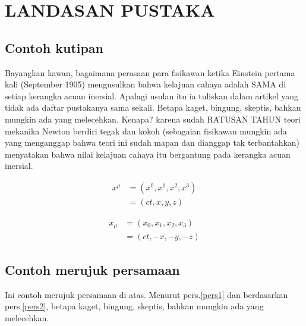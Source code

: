 \chapter{LANDASAN PUSTAKA}

\section{Contoh kutipan}
Bayangkan kawan, bagaimana perasaan para fisikawan ketika Einstein pertama kali (September 1905) mengusulkan bahwa kelajuan  cahaya adalah SAMA di setiap kerangka acuan inersial. Apalagi usulan itu ia tuliskan dalam artikel yang tidak ada daftar pustakanya sama sekali. Betapa kaget, bingung, skeptis, bahkan mungkin ada yang melecehkan. Kenapa? karena sudah RATUSAN TAHUN teori mekanika Newton berdiri tegak dan kokoh (sebagaian fisikawan mungkin ada yang menganggap bahwa teori ini sudah mapan dan dianggap tak terbantahkan) menyatakan bahwa nilai kelajuan cahaya itu bergantung pada kerangka acuan inersial\cite{arikunto2002}. 

\begin{equation}
\label{pers1}
\begin{split}
x^\mu & = (x^0,x^1,x^2,x^3 )\\ 
& = ( ct,x,y,z )
\end{split}
\end{equation}

\begin{equation}
\label{pers2}
\begin{split}
x_\mu & = (x_0,x_1,x_2,x_3 )\\
& = ( ct,-x,-y,-z )
\end{split}
\end{equation}

\section{Contoh merujuk persamaan}

Ini contoh merujuk persamaan di atas. Menurut pers.\eqref{pers1} dan berdasarkan pers.\eqref{pers2}, betapa kaget, bingung, skeptis, bahkan mungkin ada yang melecehkan.
